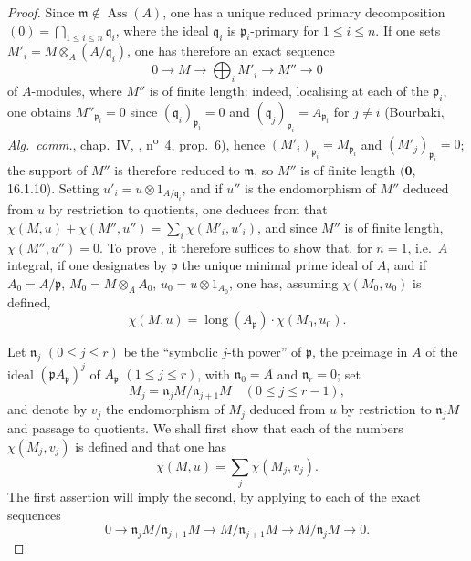 \begin{proof}
Since $\mathfrak{m}\notin\operatorname{Ass}(A)$, one has a unique reduced primary decomposition $(0)=\bigcap_{1\leq i\leq n}\mathfrak{q}_i$, where the ideal $\mathfrak{q}_i$ is $\mathfrak{p}_i$-primary for $1\leq i\leq n$.
If one sets $M'_i=M\otimes_A(A/\mathfrak{q}_i)$, one has therefore an exact sequence
\[
  0\to M\to\bigoplus_i M'_i\to M''\to 0
\]
of $A$-modules, where $M''$ is of finite length:
indeed, localising at each of the $\mathfrak{p}_i$, one obtains $M''_{\mathfrak{p}_i}=0$ since $(\mathfrak{q}_i)_{\mathfrak{p}_i}=0$ and $(\mathfrak{q}_j)_{\mathfrak{p}_i}=A_{\mathfrak{p}_i}$ for $j\neq i$ (Bourbaki, \emph{Alg.~comm.}, chap.~IV, , n\textsuperscript{o}~4, prop.~6), hence $(M'_i)_{\mathfrak{p}_i}=M_{\mathfrak{p}_i}$ and $(M'_j)_{\mathfrak{p}_i}=0$;
the support of $M''$ is therefore reduced to $\mathfrak{m}$, so $M''$ is of finite length $(\mathbf{0}$, 16.1.10).
Setting $u'_i=u\otimes 1_{A/\mathfrak{q}_i}$, and if $u''$ is the endomorphism of $M''$ deduced from $u$ by restriction to quotients, one deduces from  that $\chi(M,u)+\chi(M'',u'')=\sum_i\chi(M'_i,u'_i)$, and since $M''$ is of finite length, $\chi(M'',u'')=0$.
To prove , it therefore suffices to show that, for $n=1$, i.e.\ $A$ integral, if one designates by $\mathfrak{p}$ the unique minimal prime ideal of $A$, and if $A_0=A/\mathfrak{p}$, $M_0=M\otimes_A A_0$, $u_0=u\otimes 1_{A_0}$, one has, assuming $\chi(M_0,u_0)$ is defined,
\[
\label{IV.21.10.17.9}
  \chi(M,u)=\operatorname{long}(A_\mathfrak{p})\cdot\chi(M_0,u_0).
  \tag{21.10.17.9}
\]


Let $\mathfrak{n}_j$ $(0\leq j\leq r)$ be the ``symbolic $j$-th power'' of $\mathfrak{p}$, the preimage in $A$ of the ideal $(\mathfrak{p} A_\mathfrak{p})^j$ of $A_\mathfrak{p}$ $(1\leq j\leq r)$, with $\mathfrak{n}_0=A$ and $\mathfrak{n}_r=0$; set
\[
  M_j=\mathfrak{n}_j M/\mathfrak{n}_{j+1}M\quad(0\leq j\leq r-1),
\]
and denote by $v_j$ the endomorphism of $M_j$ deduced from $u$ by restriction to $\mathfrak{n}_j M$ and passage to quotients.
We shall first show that each of the numbers $\chi(M_j,v_j)$ is defined and that one has
\[
\label{IV.21.10.17.10}
  \chi(M,u)=\sum_j\chi(M_j,v_j).
  \tag{21.10.17.10}
\]
The first assertion will imply the second, by applying  to each of the exact sequences
\[
  0\to\mathfrak{n}_j M/\mathfrak{n}_{j+1}M\to M/\mathfrak{n}_{j+1}M\to M/\mathfrak{n}_j M\to 0.
\]


\end{proof}

